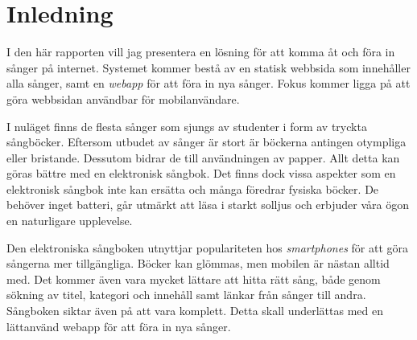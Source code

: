 \section{Inledning}

I den här rapporten vill jag presentera en lösning för att komma åt och föra in sånger på internet. Systemet kommer bestå av en statisk webbsida som innehåller alla sånger, samt en \emph{webapp} för att föra in nya sånger. Fokus kommer ligga på att göra webbsidan användbar för mobilanvändare.

I nuläget finns de flesta sånger som sjungs av studenter i form av tryckta sångböcker. Eftersom utbudet av sånger är stort är böckerna antingen otympliga eller bristande. Dessutom bidrar de till användningen av papper. Allt detta kan göras bättre med en elektronisk sångbok. Det finns dock vissa aspekter som en elektronisk sångbok inte kan ersätta och många föredrar fysiska böcker. De behöver inget batteri, går utmärkt att läsa i starkt solljus och erbjuder våra ögon en naturligare upplevelse.

Den elektroniska sångboken utnyttjar populariteten hos \emph{smartphones} för att göra sångerna mer tillgängliga. Böcker kan glömmas, men mobilen är nästan alltid med. Det kommer även vara mycket lättare att hitta rätt sång, både genom sökning av titel, kategori och innehåll samt länkar från sånger till andra. Sångboken siktar även på att vara komplett. Detta skall underlättas med en lättanvänd webapp för att föra in nya sånger.